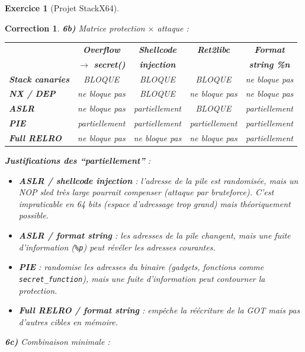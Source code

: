 \documentclass[a4paper,11pt]{article}
\theoremstyle{plain}
\newtheorem{correction}{Correction}
\theoremstyle{definition}
\newtheorem{exercice}{Exercice}
\begin{document}
\begin{exercice}[Projet StackX64]
\begin{correction}
\textbf{6b)} Matrice protection $\times$ attaque :

\begin{center}
\begin{tabular}{l|c|c|c|c}
\toprule
& \textbf{Overflow} & \textbf{Shellcode} & \textbf{Ret2libc} & \textbf{Format} \\
& \textbf{$\to$ secret()} & \textbf{injection} & & \textbf{string \%n} \\
\midrule
\textbf{Stack canaries} & BLOQUE & BLOQUE & BLOQUE & ne bloque pas \\
\midrule
\textbf{NX / DEP} & ne bloque pas & BLOQUE & ne bloque pas & ne bloque pas \\
\midrule
\textbf{ASLR} & ne bloque pas & partiellement & BLOQUE & partiellement \\
\midrule
\textbf{PIE} & partiellement & partiellement & partiellement & partiellement \\
\midrule
\textbf{Full RELRO} & ne bloque pas & ne bloque pas & ne bloque pas & partiellement \\
\bottomrule
\end{tabular}
\end{center}

\textbf{Justifications des ``partiellement''} :
\begin{itemize}
    \item \textbf{ASLR / shellcode injection} : l'adresse de la pile est randomisée, mais un NOP sled très large pourrait compenser (attaque par bruteforce). C'est impraticable en 64 bits (espace d'adressage trop grand) mais théoriquement possible.
    \item \textbf{ASLR / format string} : les adresses de la pile changent, mais une fuite d'information (\texttt{\%p}) peut révéler les adresses courantes.
    \item \textbf{PIE} : randomise les adresses du binaire (gadgets, fonctions comme \texttt{secret\_function}), mais une fuite d'information peut contourner la protection.
    \item \textbf{Full RELRO / format string} : empêche la réécriture de la GOT mais pas d'autres cibles en mémoire.
\end{itemize}

\textbf{6c)} Combinaison minimale :


\end{correction}
\end{exercice}
\end{document}
